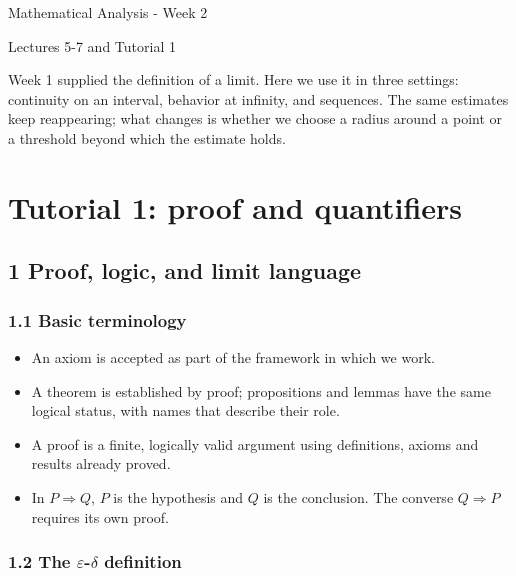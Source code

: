 \documentclass[11pt,a4paper]{article}
\begin{document}
\begin{center}
{\LARGE Mathematical Analysis - Week 2\par}
\vspace{5pt}
{\large Lectures 5-7 and Tutorial 1\par}
\end{center}
{\small\tableofcontents}
\vspace{7pt}
Week 1 supplied the definition of a limit. Here we use it in three
settings: continuity on an interval, behavior at infinity, and
sequences. The same estimates keep reappearing; what changes is whether
we choose a radius around a point or a threshold beyond which the
estimate holds.

\section{Tutorial 1: proof and
quantifiers}\label{tutorial-1-proof-and-quantifiers}

\subsection{1 Proof, logic, and limit
language}\label{proof-logic-and-limit-language}

\subsubsection{1.1 Basic terminology}\label{basic-terminology}

\begin{itemize}
\item
  An axiom is accepted as part of the framework in which we work.
\item
  A theorem is established by proof; propositions and lemmas have the
  same logical status, with names that describe their role.
\item
  A proof is a finite, logically valid argument using definitions,
  axioms and results already proved.
\item
  In \(P\Rightarrow Q\), \(P\) is the hypothesis and \(Q\) is the
  conclusion. The converse \(Q\Rightarrow P\) requires its own proof.
\end{itemize}

\subsubsection{\texorpdfstring{1.2 The \(\varepsilon\)-\(\delta\)
definition}{1.2 The \textbackslash varepsilon-\textbackslash delta definition}}\label{the-varepsilon-delta-definition}
\end{document}
